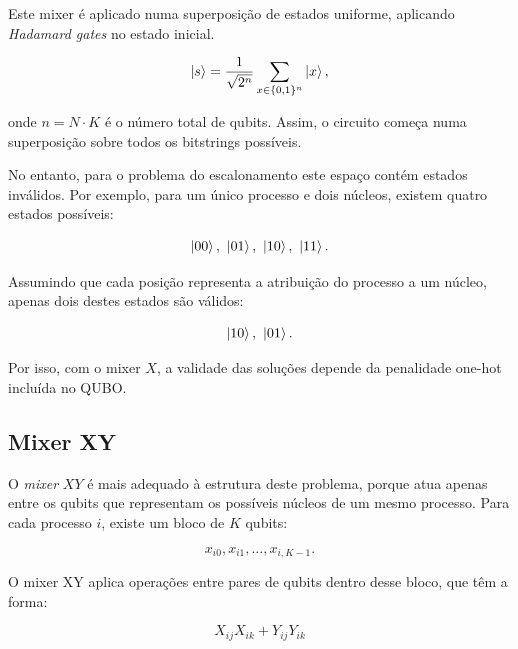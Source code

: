 Este mixer é aplicado numa superposição de estados uniforme, aplicando \textit{Hadamard gates} no estado inicial.

\begin{equation}
    \ket{s} = \frac{1}{\sqrt{2^n}} \sum_{x \in \{0,1\}^n} \ket{x},
\end{equation}

onde $n=N \cdot K$ é o número total de qubits. Assim, o circuito começa numa superposição sobre todos os bitstrings possíveis.

No entanto, para o problema do escalonamento este espaço contém estados inválidos. Por exemplo, para um único processo e dois núcleos, existem
quatro estados possíveis:

\begin{equation}
    \ket{00},\ \ket{01},\ \ket{10},\ \ket{11}.
\end{equation}

Assumindo que cada posição representa a atribuição do processo a um núcleo, apenas
dois destes estados são válidos:

\begin{equation}
    \ket{10},\ \ket{01}.
\end{equation}

Por isso, com o mixer $X$, a validade das soluções depende da penalidade one-hot incluída no \acs{QUBO}.

\subsection{Mixer XY}
\label{subsec:mixer-xy}

O \textit{mixer} $XY$ é mais adequado à estrutura deste problema, porque atua
apenas entre os qubits que representam os possíveis núcleos de um mesmo processo.
Para cada processo $i$, existe um bloco de $K$ qubits:

\begin{equation}
    x_{i0}, x_{i1}, \dots, x_{i,K-1}.
\end{equation}

O mixer XY aplica operações entre pares de qubits dentro desse bloco, que têm a forma:

\begin{equation}
   X_{ij}X_{ik} + Y_{ij}Y_{ik}
\end{equation}

